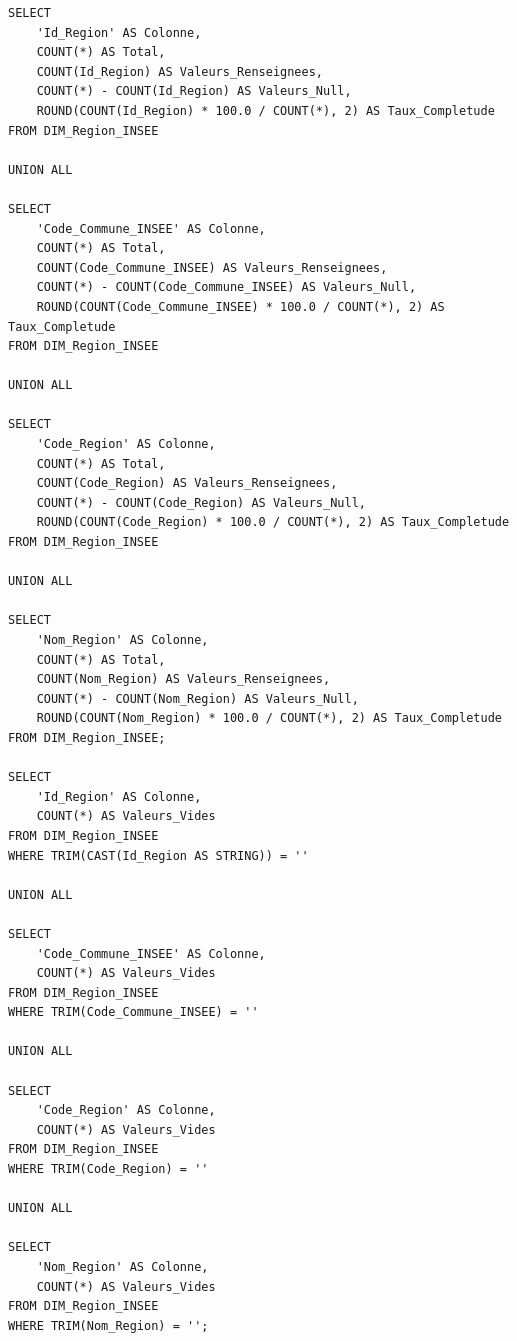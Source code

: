\begin{verbatim}
SELECT
    'Id_Region' AS Colonne,
    COUNT(*) AS Total,
    COUNT(Id_Region) AS Valeurs_Renseignees,
    COUNT(*) - COUNT(Id_Region) AS Valeurs_Null,
    ROUND(COUNT(Id_Region) * 100.0 / COUNT(*), 2) AS Taux_Completude
FROM DIM_Region_INSEE

UNION ALL

SELECT
    'Code_Commune_INSEE' AS Colonne,
    COUNT(*) AS Total,
    COUNT(Code_Commune_INSEE) AS Valeurs_Renseignees,
    COUNT(*) - COUNT(Code_Commune_INSEE) AS Valeurs_Null,
    ROUND(COUNT(Code_Commune_INSEE) * 100.0 / COUNT(*), 2) AS Taux_Completude
FROM DIM_Region_INSEE

UNION ALL

SELECT
    'Code_Region' AS Colonne,
    COUNT(*) AS Total,
    COUNT(Code_Region) AS Valeurs_Renseignees,
    COUNT(*) - COUNT(Code_Region) AS Valeurs_Null,
    ROUND(COUNT(Code_Region) * 100.0 / COUNT(*), 2) AS Taux_Completude
FROM DIM_Region_INSEE

UNION ALL

SELECT
    'Nom_Region' AS Colonne,
    COUNT(*) AS Total,
    COUNT(Nom_Region) AS Valeurs_Renseignees,
    COUNT(*) - COUNT(Nom_Region) AS Valeurs_Null,
    ROUND(COUNT(Nom_Region) * 100.0 / COUNT(*), 2) AS Taux_Completude
FROM DIM_Region_INSEE;

SELECT
    'Id_Region' AS Colonne,
    COUNT(*) AS Valeurs_Vides
FROM DIM_Region_INSEE
WHERE TRIM(CAST(Id_Region AS STRING)) = ''

UNION ALL

SELECT
    'Code_Commune_INSEE' AS Colonne,
    COUNT(*) AS Valeurs_Vides
FROM DIM_Region_INSEE
WHERE TRIM(Code_Commune_INSEE) = ''

UNION ALL

SELECT
    'Code_Region' AS Colonne,
    COUNT(*) AS Valeurs_Vides
FROM DIM_Region_INSEE
WHERE TRIM(Code_Region) = ''

UNION ALL

SELECT
    'Nom_Region' AS Colonne,
    COUNT(*) AS Valeurs_Vides
FROM DIM_Region_INSEE
WHERE TRIM(Nom_Region) = '';
\end{verbatim}
